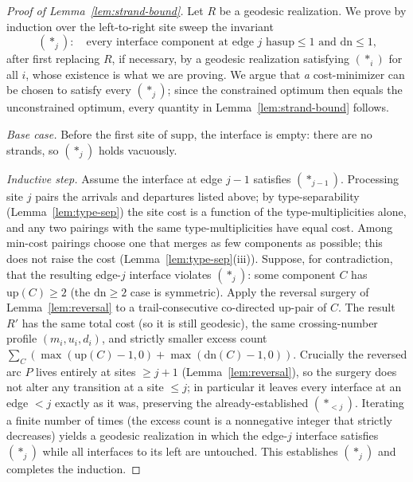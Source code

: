 \begin{proof}[Proof of Lemma~\ref{lem:strand-bound}]
Let $R$ be a geodesic realization.  We prove by induction over the
left-to-right site sweep the invariant
\[
(\ast_j)\colon\quad \text{every interface component at edge $j$ has
$\mathrm{up}\le1$ and $\mathrm{dn}\le1$,}
\]
after first replacing $R$, if necessary, by a geodesic realization satisfying
$(\ast_i)$ for all $i$, whose existence is what we are proving.  We argue that
\emph{a} cost-minimizer can be chosen to satisfy every $(\ast_j)$; since the
constrained optimum then equals the unconstrained optimum, every quantity in
Lemma~\ref{lem:strand-bound} follows.

\emph{Base case.}  Before the first site of $\mathrm{supp}$, the interface is
empty: there are no strands, so $(\ast_j)$ holds vacuously.

\emph{Inductive step.}  Assume the interface at edge $j-1$ satisfies
$(\ast_{j-1})$.  Processing site $j$ pairs the arrivals and departures listed
above; by type-separability (Lemma~\ref{lem:type-sep}) the site cost is a
function of the type-multiplicities alone, and any two pairings with the same
type-multiplicities have equal cost.  Among min-cost pairings choose one that
merges as few components as possible; this does not raise the cost
(Lemma~\ref{lem:type-sep}(iii)).  Suppose, for contradiction, that the
resulting edge-$j$ interface violates $(\ast_j)$: some component $C$ has
$\mathrm{up}(C)\ge2$ (the $\mathrm{dn}\ge2$ case is symmetric).  Apply the
reversal surgery of Lemma~\ref{lem:reversal} to a trail-consecutive
co-directed up-pair of $C$.  The result $R'$ has the same total cost (so it is
still geodesic), the same crossing-number profile $(m_i,u_i,d_i)$, and
strictly smaller excess count
$\sum_C(\max(\mathrm{up}(C)-1,0)+\max(\mathrm{dn}(C)-1,0))$.  Crucially the
reversed arc $P$ lives entirely at sites $\ge j+1$
(Lemma~\ref{lem:reversal}), so the surgery does not alter any transition at a
site $\le j$; in particular it leaves every interface at an edge $<j$ exactly
as it was, preserving the already-established $(\ast_{<j})$.  Iterating a
finite number of times (the excess count is a nonnegative integer that
strictly decreases) yields a geodesic realization in which the edge-$j$
interface satisfies $(\ast_j)$ while all interfaces to its left are untouched.
This establishes $(\ast_j)$ and completes the induction.


\end{proof}

